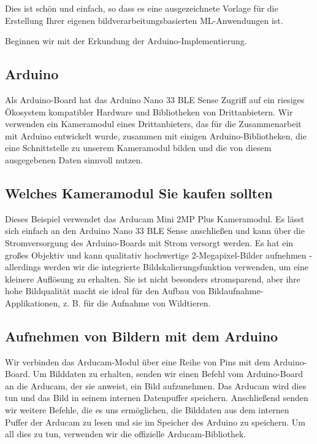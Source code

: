 Dies ist schön und einfach, so dass es eine ausgezeichnete Vorlage für die Erstellung Ihrer eigenen bildverarbeitungsbasierten ML-Anwendungen ist.

Beginnen wir mit der Erkundung der Arduino-Implementierung.


\subsection{Arduino}

Als Arduino-Board hat das Arduino Nano 33 BLE Sense Zugriff auf ein riesiges Ökosystem kompatibler Hardware und Bibliotheken von Drittanbietern. Wir verwenden ein Kameramodul eines Drittanbieters, das für die Zusammenarbeit mit Arduino entwickelt wurde, zusammen mit einigen Arduino-Bibliotheken, die eine Schnittstelle zu unserem Kameramodul bilden und die von diesem ausgegebenen Daten sinnvoll nutzen.

\subsection{Welches Kameramodul Sie kaufen sollten}

Dieses Beispiel verwendet das Arducam Mini 2MP Plus Kameramodul. Es lässt sich einfach an den Arduino Nano 33 BLE Sense anschließen und kann über die Stromversorgung des Arduino-Boards mit Strom versorgt werden. Es hat ein großes Objektiv und kann qualitativ hochwertige 2-Megapixel-Bilder aufnehmen - allerdings werden wir die integrierte Bildskalierungsfunktion verwenden, um eine kleinere Auflösung zu erhalten. Sie ist nicht besonders stromsparend, aber ihre hohe Bildqualität macht sie ideal für den Aufbau von Bildaufnahme-Applikationen, z. B. für die Aufnahme von Wildtieren.

\subsection{Aufnehmen von Bildern mit dem Arduino}

Wir verbinden das Arducam-Modul über eine Reihe von Pins mit dem Arduino-Board. Um Bilddaten zu erhalten, senden wir einen Befehl vom Arduino-Board an die Arducam, der sie anweist, ein Bild aufzunehmen. Das Arducam wird dies tun und das Bild in seinem internen Datenpuffer speichern. Anschließend senden wir weitere Befehle, die es uns ermöglichen, die Bilddaten aus dem internen Puffer der Arducam zu lesen und sie im Speicher des Arduino zu speichern. Um all dies zu tun, verwenden wir die offizielle Arducam-Bibliothek.

